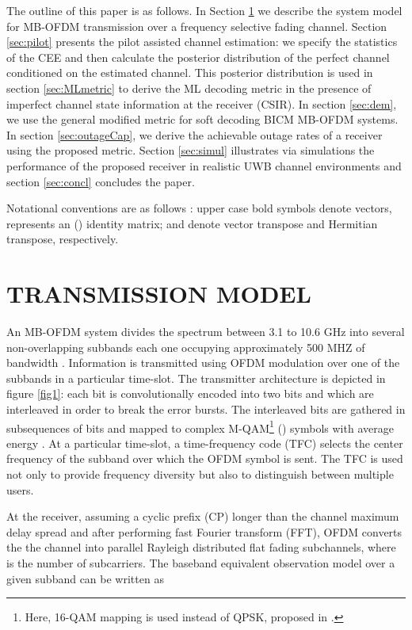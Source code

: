 \documentclass{article}
\begin{document}
The outline of this paper is as follows. In Section \ref{sec:sysmodel} we describe the system model for MB-OFDM transmission over a frequency selective fading channel. Section \ref{sec:pilot} presents the pilot assisted channel estimation: we specify the statistics of the CEE and then calculate the posterior distribution of the perfect channel conditioned on the estimated channel. This posterior distribution is used in section \ref{sec:MLmetric} to derive the ML decoding metric in the presence of imperfect channel state information at the receiver (CSIR). In section \ref{sec:dem}, we use the general modified metric for soft decoding  BICM MB-OFDM systems. In section \ref{sec:outageCap}, we derive the achievable outage rates of a receiver using the proposed metric. 
Section \ref{sec:simul} illustrates via simulations the performance of the proposed receiver in realistic UWB channel environments and section \ref{sec:concl} concludes the paper.

Notational conventions are as follows : upper case bold symbols denote vectors,  represents an () identity matrix;  and  denote vector transpose and Hermitian transpose, respectively.   
\section{TRANSMISSION MODEL}
\label{sec:sysmodel}
An MB-OFDM system divides the spectrum between 3.1 to 10.6 GHz into several
non-overlapping subbands each one occupying approximately 500 MHZ of bandwidth
\cite{batra_jour}. Information is transmitted using OFDM modulation over one of the subbands in a particular time-slot. The transmitter architecture is depicted in figure \ref{fig1}: each bit  is convolutionally encoded into two bits  and  which are interleaved in order to break the error bursts. The interleaved bits are gathered in subsequences of  bits  and mapped to complex M-QAM\footnote[1]{Here, 16-QAM mapping is used instead of QPSK, proposed in \cite{norme_mb}.} () symbols  with average energy . At a particular time-slot, a time-frequency code (TFC) selects the center frequency of the subband over which the OFDM symbol is sent. The TFC is used not only to provide frequency diversity but also to distinguish between multiple users.  

At the receiver, assuming a cyclic prefix (CP) longer than the channel maximum delay spread and after performing fast Fourier transform (FFT), OFDM converts the the channel into  parallel Rayleigh distributed flat fading subchannels, where  is the number of subcarriers.
The baseband equivalent observation model over a given subband can be written as 
         
\end{document}
